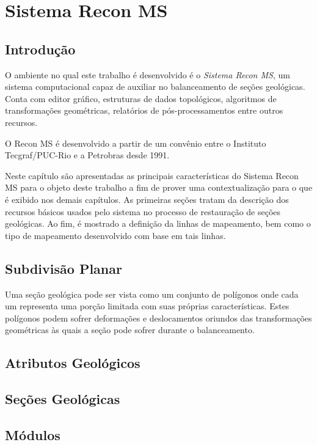 
\chapter{Sistema Recon MS}

\section{Introdução}

O ambiente no qual este trabalho é desenvolvido é o \textit{Sistema Recon MS}, um sistema computacional capaz de auxiliar no balanceamento de seções geológicas. Conta com editor gráfico, estruturas de dados topológicos, algoritmos de transformações geométricas, relatórios de pós-processamentos entre outros recursos.

O Recon MS é desenvolvido a partir de um convênio entre o Instituto Tecgraf/PUC-Rio e a Petrobras desde 1991.

Neste capítulo são apresentadas as principais características do Sistema Recon MS para o objeto deste trabalho a fim de prover uma contextualização para o que é exibido nos demais capítulos. As primeiras seções tratam da descrição dos recursos básicos usados pelo sistema no processo de restauração de seções geológicas. Ao fim, é mostrado a definição da linhas de mapeamento, bem como o tipo de mapeamento desenvolvido com base em tais linhas.

\section{Subdivisão Planar} %

Uma seção geológica pode ser vista como um conjunto de polígonos onde cada um representa uma porção limitada com suas próprias características. Estes polígonos podem sofrer deformações e deslocamentos oriundos das transformações geométricas às quais a seção pode sofrer durante o balanceamento.

\section{Atributos Geológicos}

\section{Seções Geológicas} %

\section{Módulos}

